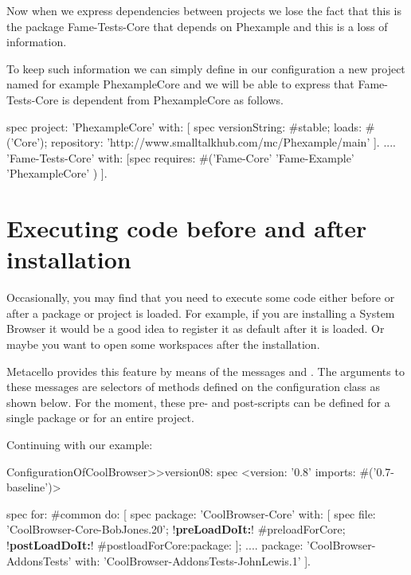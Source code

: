 \documentclass[a4paper,10pt,twoside]{book}
\begin{document}
Now when we express dependencies between projects we lose the fact that this is the package Fame-Tests-Core that depends on Phexample and this is a loss of information. 

To keep such information we can simply define in our configuration a new project named for example PhexampleCore and we will be able to express that Fame-Tests-Core is dependent from PhexampleCore as follows. 


\begin{code}{}
spec 
	project: 'PhexampleCore' 
	with: [ spec
               versionString: #stable;
               loads: #('Core');
               repository: 'http://www.smalltalkhub.com/mc/Phexample/main' ].
	....
	'Fame-Tests-Core' with: [spec requires: #('Fame-Core' 'Fame-Example' 'PhexampleCore' ) ].
\end{code}


\section{Executing code before and after installation}
Occasionally, you may find that you need to execute some code either before or after a package or project is loaded. For example, if you are installing a System Browser it would be a good idea to register it as default after it is loaded. Or maybe you want to open some workspaces after the installation. 

Metacello provides this feature by means of the messages  and .  The arguments to these messages are selectors of methods defined on the configuration class as shown below. For the moment, these pre- and post-scripts can be defined for a single package or for an entire project. 

Continuing with our example:

\begin{code}{}
ConfigurationOfCoolBrowser>>version08: spec 
       <version: '0.8' imports: #('0.7-baseline')>
       
       spec for: #common do: [
              spec 
                     package: 'CoolBrowser-Core' with: [
                            spec 
                                   file: 'CoolBrowser-Core-BobJones.20';
                                   !\textbf{preLoadDoIt:}! #preloadForCore;
                                   !\textbf{postLoadDoIt:}! #postloadForCore:package: ];
                     ....
                     package: 'CoolBrowser-AddonsTests' with: 'CoolBrowser-AddonsTests-JohnLewis.1' ].
\end{code}
\end{document}
